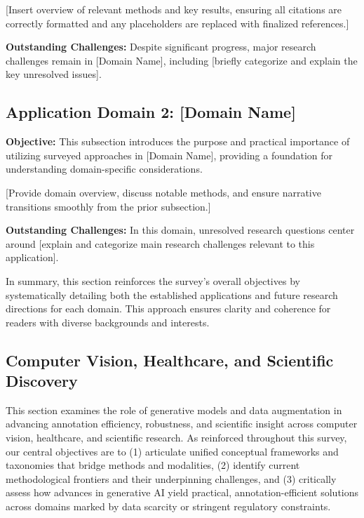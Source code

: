 \documentclass[sigconf]{acmart}
\begin{document}
[Insert overview of relevant methods and key results, ensuring all citations are correctly formatted and any placeholders are replaced with finalized references.]

\textbf{Outstanding Challenges:} Despite significant progress, major research challenges remain in [Domain Name], including [briefly categorize and explain the key unresolved issues].

\subsection{Application Domain 2: [Domain Name]}
\textbf{Objective:} This subsection introduces the purpose and practical importance of utilizing surveyed approaches in [Domain Name], providing a foundation for understanding domain-specific considerations.

[Provide domain overview, discuss notable methods, and ensure narrative transitions smoothly from the prior subsection.]

\textbf{Outstanding Challenges:} In this domain, unresolved research questions center around [explain and categorize main research challenges relevant to this application].


In summary, this section reinforces the survey’s overall objectives by systematically detailing both the established applications and future research directions for each domain. This approach ensures clarity and coherence for readers with diverse backgrounds and interests.

\subsection{Computer Vision, Healthcare, and Scientific Discovery}

This section examines the role of generative models and data augmentation in advancing annotation efficiency, robustness, and scientific insight across computer vision, healthcare, and scientific research. As reinforced throughout this survey, our central objectives are to (1) articulate unified conceptual frameworks and taxonomies that bridge methods and modalities, (2) identify current methodological frontiers and their underpinning challenges, and (3) critically assess how advances in generative AI yield practical, annotation-efficient solutions across domains marked by data scarcity or stringent regulatory constraints.
\end{document}
